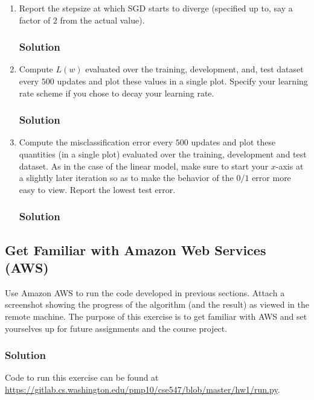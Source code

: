 \documentclass[letterpaper,11pt]{article}
\begin{document}
\begin{enumerate}
\item Report the stepsize at which SGD starts to diverge (specified up to, say a
  factor of $2$ from the actual value).

    \subsubsection*{Solution}

  \item Compute $L(w)$ evaluated over the training, development, and, test
    dataset every $500$ updates and plot these values in a single plot. Specify
    your learning rate scheme if you chose to decay your learning rate.

    \subsubsection*{Solution}
  \item Compute the misclassification error every $500$ updates and plot these
    quantities (in a single plot) evaluated over the training, development and
    test dataset. As in the case of the linear model, make sure to start your
    $x$-axis at a slightly later iteration so as to make the behavior of the
    $0/1$ error more easy to view. Report the lowest test error.
    
    \subsubsection*{Solution}

  
\end{enumerate}


\subsection*{Get Familiar with Amazon Web Services (AWS)}

Use Amazon AWS to run the code developed in previous sections. Attach a
screenshot showing the progress of the algorithm (and the result) as viewed in
the remote machine. The purpose of this exercise is to get familiar with AWS
and set yourselves up for future assignments and the course project.

\subsubsection*{Solution}


Code to run this exercise can be found at \url{https://gitlab.cs.washington.edu/pmp10/cse547/blob/master/hw1/run.py}.
\end{document}
